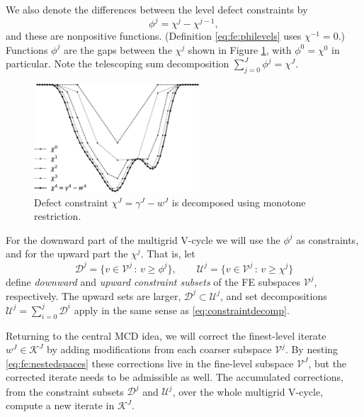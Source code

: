 \documentclass[letterpaper,final,12pt,reqno]{amsart}
\theoremstyle{cstyle}
\theoremstyle{cstyle*}
\theoremstyle{dstyle}
\numberwithin{equation}{section}
\numberwithin{figure}{section}
\numberwithin{table}{section}
\numberwithin{theorem}{section}
\begin{document}
We also denote the differences between the level defect constraints by
\begin{equation}
\phi^j = \chi^j - \chi^{j-1}, \label{eq:fe:philevels}
\end{equation}
and these are nonpositive functions.  (Definition \eqref{eq:fe:philevels} uses $\chi^{-1}=0$.)  Functions $\phi^j$ are the gaps between the $\chi^j$ shown in Figure \ref{fig:chiphilevels}, with $\phi^0=\chi^0$ in particular.  Note the telescoping sum decomposition $\sum_{j=0}^J \phi^j = \chi^J$.

\begin{figure}
\includegraphics[width=0.55\textwidth]{fixfigs/chiphilevels.pdf}
\caption{Defect constraint $\chi^J = \gamma^J - w^J$ is decomposed using monotone restriction.}
\label{fig:chiphilevels}
\end{figure}

For the downward part of the multigrid V-cycle we will use the $\phi^j$ as constraints, and for the upward part the $\chi^j$.  That is, let
\begin{equation}
\mathcal{D}^j = \{v \in \mathcal{V}^j \,:\, v\ge \phi^j\}, \qquad \mathcal{U}^j = \{v \in \mathcal{V}^j \,:\, v\ge \chi^j\} \label{eq:fe:constraintsets}
\end{equation}
define \emph{downward} and \emph{upward constraint subsets} of the FE subspaces $\mathcal{V}^j$, respectively.  The upward sets are larger, $\mathcal{D}^j \subset \mathcal{U}^j$, and set decompositions $\mathcal{U}^j = \sum_{i=0}^j \mathcal{D}^i$ apply in the same sense as \eqref{eq:constraintdecomp}.

Returning to the central MCD idea, we will correct the finest-level iterate $w^J\in \mathcal{K}^J$ by adding modifications from each coarser subspace $\mathcal{V}^j$.  By nesting \eqref{eq:fe:nestedspaces} these corrections live in the fine-level subspace $\mathcal{V}^J$, but the corrected iterate needs to be admissible as well.  The accumulated corrections, from the constraint subsets $\mathcal{D}^j$ and $\mathcal{U}^j$, over the whole multigrid V-cycle, compute a new iterate in $\mathcal{K}^J$.
\end{document}
